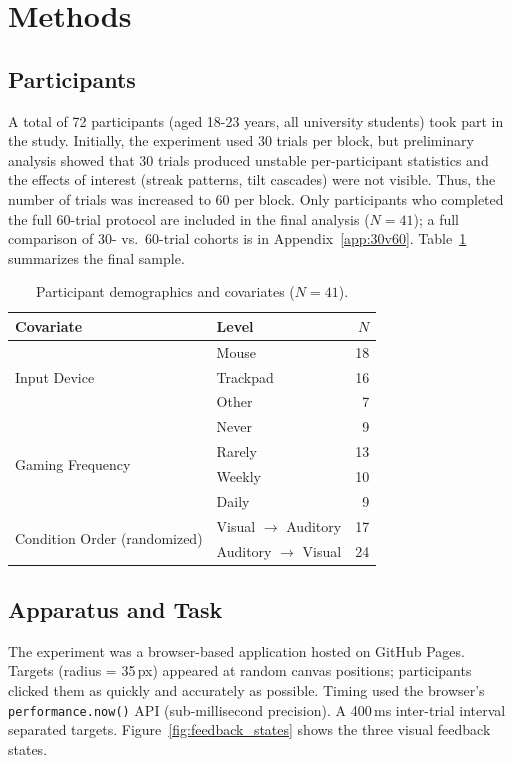 \documentclass[12pt,letterpaper]{article}
\begin{document}
\section{Methods}

\subsection{Participants}

A total of 72 participants (aged 18-23 years, all university students) took part in the study. Initially, the experiment used 30 trials per block, but preliminary analysis showed that 30 trials produced unstable per-participant statistics and the effects of interest (streak patterns, tilt cascades) were not visible. Thus, the number of trials was increased to 60 per block. Only participants who completed the full 60-trial protocol are included in the final analysis ($N = 41$); a full comparison of 30- vs.\ 60-trial cohorts is in Appendix~\ref{app:30v60}. Table~\ref{tab:sample} summarizes the final sample.

\begin{table}[H]
\centering
\caption{Participant demographics and covariates ($N = 41$).}
\label{tab:sample}
\begin{tabular}{llr}
\toprule
\textbf{Covariate} & \textbf{Level} & \textbf{$N$} \\
\midrule
\multirow{3}{*}{Input Device} & Mouse & 18 \\
 & Trackpad & 16 \\
 & Other & 7 \\[4pt]
\multirow{4}{*}{Gaming Frequency} & Never & 9 \\
 & Rarely & 13 \\
 & Weekly & 10 \\
 & Daily & 9 \\[4pt]
\multirow{2}{*}{Condition Order (randomized)} & Visual $\to$ Auditory & 17 \\
 & Auditory $\to$ Visual & 24 \\
\bottomrule
\end{tabular}
\end{table}

\subsection{Apparatus and Task}

The experiment was a browser-based application hosted on GitHub Pages. Targets (radius = 35\,px) appeared at random canvas positions; participants clicked them as quickly and accurately as possible. Timing used the browser's \texttt{performance.now()} API (sub-millisecond precision). A 400\,ms inter-trial interval separated targets. Figure~\ref{fig:feedback_states} shows the three visual feedback states.
\end{document}
